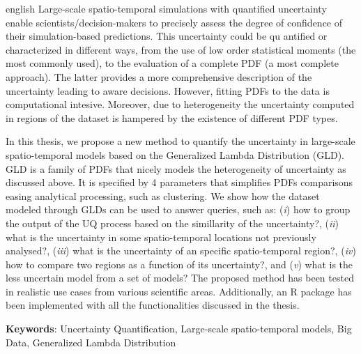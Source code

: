\documentclass[
	12pt,				%
	openright,			%
	oneside,			%
	a4paper,			%
	sumario=tradicional,%
	brazil,			%
	french,				%
	spanish,			%
	english				%
	]{abntex2}
\theoremstyle{plain}
\theoremstyle{definition}
\begin{document}
\begin{resumo}[Abstract]
 \begin{otherlanguage*}{english}
 Large-scale spatio-temporal simulations with quantified uncertainty enable scientists/decision-makers to precisely assess the degree of confidence of their simulation-based predictions. This uncertainty could be qu antified or characterized in different ways, from the use of low order statistical moments (the most commonly used), to the evaluation of a complete PDF (a most complete approach). The latter provides a more comprehensive description of the uncertainty leading to aware decisions. However, fitting PDFs to the data is computational intesive. Moreover, due to heterogeneity the uncertainty computed in regions of the dataset is hampered by the existence of different PDF types. 
 
 In this thesis, we propose a new method to quantify the uncertainty in large-scale spatio-temporal models based on the Generalized Lambda Distribution (GLD). GLD is a family of PDFs that nicely models
the heterogeneity of uncertainty as discussed above. It is specified by 4 parameters that
simplifies PDFs comparisons easing analytical processing, such as clustering. We show how
the dataset modeled through GLDs can be used to answer queries, such as: (\textit{i}) how to
group the output of the UQ process based on the simillarity of the uncertainty?, (\textit{ii}) what
is the uncertainty in some spatio-temporal locations not previously analysed?, (\textit{iii}) what is
the uncertainty of an specific spatio-temporal region?, (\textit{iv}) how to compare two regions as a
function of its uncertainty?, and (\textit{v}) what is the less uncertain model from a set of models?
The proposed method has been tested in realistic use cases from various scientific areas.
Additionally, an R package has been implemented with all the functionalities discussed in
the thesis.
 
   \textbf{Keywords}: Uncertainty Quantification, Large-scale spatio-temporal models, Big Data, Generalized Lambda Distribution
 \end{otherlanguage*}
\end{resumo}

%
\end{document}
